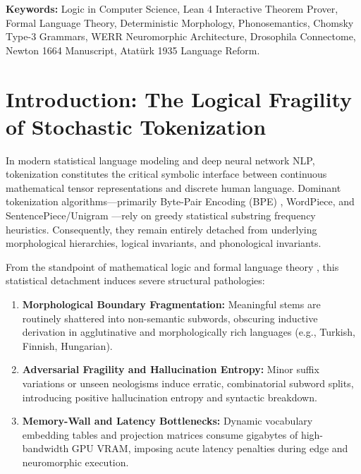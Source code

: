\documentclass[11pt,letterpaper]{article}
\begin{document}
\noindent\textbf{Keywords:} Logic in Computer Science, Lean 4 Interactive Theorem Prover, Formal Language Theory, Deterministic Morphology, Phonosemantics, Chomsky Type-3 Grammars, WERR Neuromorphic Architecture, Drosophila Connectome, Newton 1664 Manuscript, Atat\"{u}rk 1935 Language Reform.

\section{Introduction: The Logical Fragility of Stochastic Tokenization}

In modern statistical language modeling and deep neural network NLP, tokenization constitutes the critical symbolic interface between continuous mathematical tensor representations and discrete human language. Dominant tokenization algorithms---primarily Byte-Pair Encoding (BPE) \cite{sennrich2016bpe}, WordPiece, and SentencePiece/Unigram \cite{kudo2018subword}---rely on greedy statistical substring frequency heuristics. Consequently, they remain entirely detached from underlying morphological hierarchies, logical invariants, and phonological invariants.

From the standpoint of mathematical logic and formal language theory \cite{chomsky1957syntactic}, this statistical detachment induces severe structural pathologies:
\begin{enumerate}
    \item \textbf{Morphological Boundary Fragmentation:} Meaningful stems are routinely shattered into non-semantic subwords, obscuring inductive derivation in agglutinative and morphologically rich languages (e.g., Turkish, Finnish, Hungarian).
    \item \textbf{Adversarial Fragility and Hallucination Entropy:} Minor suffix variations or unseen neologisms induce erratic, combinatorial subword splits, introducing positive hallucination entropy and syntactic breakdown.
    \item \textbf{Memory-Wall and Latency Bottlenecks:} Dynamic vocabulary embedding tables and projection matrices consume gigabytes of high-bandwidth GPU VRAM, imposing acute latency penalties during edge and neuromorphic execution.
\end{enumerate}
\end{document}
